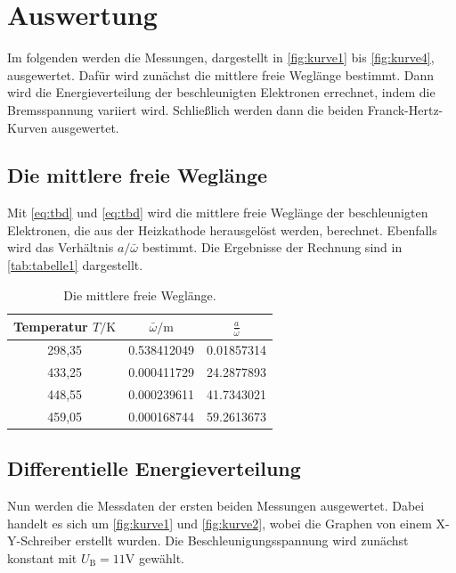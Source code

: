 \section{Auswertung}
\label{sec:Auswertung}

Im folgenden werden die Messungen, dargestellt in \autoref{fig:kurve1} bis \autoref{fig:kurve4}, ausgewertet.
Dafür wird zunächst die mittlere freie Weglänge bestimmt.
Dann wird die Energieverteilung der beschleunigten Elektronen errechnet, indem die Bremsspannung variiert wird.
Schließlich werden dann die beiden Franck-Hertz-Kurven ausgewertet.


\subsection{Die mittlere freie Weglänge}
Mit \autoref{eq:tbd} und \autoref{eq:tbd} wird die mittlere freie Weglänge der beschleunigten Elektronen,
die aus der Heizkathode herausgelöst werden, berechnet.
Ebenfalls wird das Verhältnis $a / \bar{\omega}$ bestimmt.
Die Ergebnisse der Rechnung sind in \autoref{tab:tabelle1} dargestellt.

\begin{table} [H]
  \centering
  \caption{Die mittlere freie Weglänge.}
  \label{tab:tabelle1}
  \begin{tabular}{c c c}
      \toprule
      Temperatur $T / \unit\kelvin$ & $\bar{\omega} / \unit\meter$ & $\frac{a}{\bar{\omega}}$ \\
      \midrule 
      298,35 & 0.538412049 & 0.01857314\\
      433,25 & 0.000411729 & 24.2877893\\
      448,55 & 0.000239611 & 41.7343021\\
      459,05 & 0.000168744 & 59.2613673\\
      \bottomrule
  \end{tabular}
\end{table}

\subsection{Differentielle Energieverteilung}
Nun werden die Messdaten der ersten beiden Messungen ausgewertet.
Dabei handelt es sich um \autoref{fig:kurve1} und \autoref{fig:kurve2}, wobei die Graphen von einem X-Y-Schreiber erstellt wurden.
Die Beschleunigungsspannung wird zunächst konstant mit $U_\text{B} = 11 \unit\V$ gewählt.

